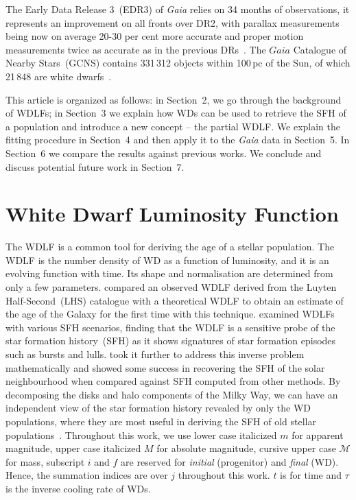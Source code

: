 \documentclass[fleqn,usenatbib]{mnras}
\begin{document}
The Early Data Release 3~(EDR3) of \textit{Gaia} relies on 34 months of observations, it
represents an improvement on all fronts over DR2, with parallax measurements
being now on average 20-30 per cent more accurate and proper motion measurements
twice as accurate as in the previous
DRs~\citep{2021A&A...649A...1G, 2021A&A...649A...2L}. The $Gaia$ Catalogue of
Nearby Stars~(GCNS) contains 331\,312 objects within 100\,pc of the Sun, of
which 21\,848 are white dwarfs~\citep{2021A&A...649A...6G}.

This article is organized as follows: in Section~2, we go through the background
of WDLFs; in Section~3 we explain how WDs can be used to retrieve the SFH of a
population and introduce a new concept -- the partial WDLF. We explain the fitting
procedure in Section~4 and then apply it to the \textit{Gaia} data in Section~5. In
Section~6 we compare the results against previous works. We conclude and discuss
potential future work in Section~7.

\section{White Dwarf Luminosity Function}
The WDLF is a common tool for deriving the age of a stellar population. The WDLF is
the number density of WD as a function of luminosity, and it is an evolving
function with time. Its shape and normalisation are determined from only a few
parameters. \citet{1987ApJ...315L..77W} compared an observed WDLF derived from
the Luyten Half-Second~(LHS) catalogue with a theoretical WDLF to obtain an
estimate of the age of the Galaxy for the first time with this technique.
\citet{1990ApJ...352..605N} examined WDLFs with various SFH scenarios, finding 
that the WDLF is a sensitive probe of the star formation history~(SFH) as
it shows signatures of star formation episodes such as bursts and lulls.
\citet{2013MNRAS.434.1549R} took it further to address this inverse problem
mathematically and showed some success in recovering the SFH of the solar
neighbourhood when compared against SFH computed from other methods. By
decomposing the disks and halo components of the Milky Way, we can have an
independent view of the star formation history revealed by only the WD
populations, where they are most useful in deriving the SFH of old stellar
populations~\citep{2011MNRAS.417...93R, 2017ASPC..509...25L}. Throughout this
work, we use lower case italicized $m$ for apparent magnitude, upper case
italicized $M$ for absolute magnitude, cursive upper case $\mathcal{M}$ for
mass, subscript $i$ and $f$ are reserved for \textit{initial} (progenitor) and
\textit{final} (WD). Hence, the summation indices are over $j$ throughout this
work. $t$ is for time and $\tau$ is the inverse cooling rate of WDs.
\end{document}
